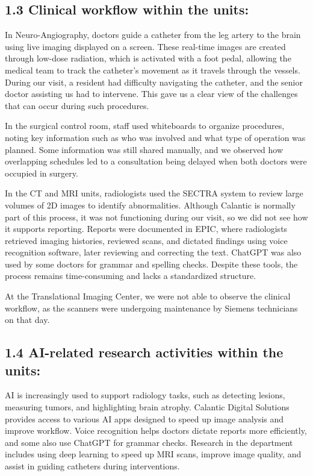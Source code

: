 \documentclass[a4paper, chapterprefix=true, numbers=noenddot]{scrreprt}
\begin{document}
\subsection*{1.3 Clinical workflow within the units:} 
In Neuro-Angiography, doctors guide a catheter from the leg artery to the brain using live imaging displayed on a screen. These real-time images are created through low-dose radiation, which is activated with a foot pedal, allowing the medical team to track the catheter’s movement as it travels through the vessels. During our visit, a resident had difficulty navigating the catheter, and the senior doctor assisting us had to intervene. This gave us a clear view of the challenges that can occur during such procedures. \par
\vspace{\baselineskip}
\noindent
In the surgical control room, staff used whiteboards to organize procedures, noting key information such as who was involved and what type of operation was planned. Some information was still shared manually, and we observed how overlapping schedules led to a consultation being delayed when both doctors were occupied in surgery. \par
\vspace{\baselineskip}
\noindent
In the CT and MRI units, radiologists used the SECTRA system to review large volumes of 2D images to identify abnormalities. Although Calantic is normally part of this process, it was not functioning during our visit, so we did not see how it supports reporting. Reports were documented in EPIC, where radiologists retrieved imaging histories, reviewed scans, and dictated findings using voice recognition software, later reviewing and correcting the text. ChatGPT was also used by some doctors for grammar and spelling checks. Despite these tools, the process remains time-consuming and lacks a standardized structure.\par
\vspace{\baselineskip}
\noindent
At the Translational Imaging Center, we were not able to observe the clinical workflow, as the scanners were undergoing maintenance by Siemens technicians on that day. \par

\subsection*{1.4 AI-related research activities within the units:} 
AI is increasingly used to support radiology tasks, such as detecting lesions, measuring tumors, and highlighting brain atrophy. Calantic Digital Solutions provides access to various AI apps designed to speed up image analysis and improve workflow. Voice recognition helps doctors dictate reports more efficiently, and some also use ChatGPT for grammar checks. Research in the department includes using deep learning to speed up MRI scans, improve image quality, and assist in guiding catheters during interventions. \par
\end{document}
